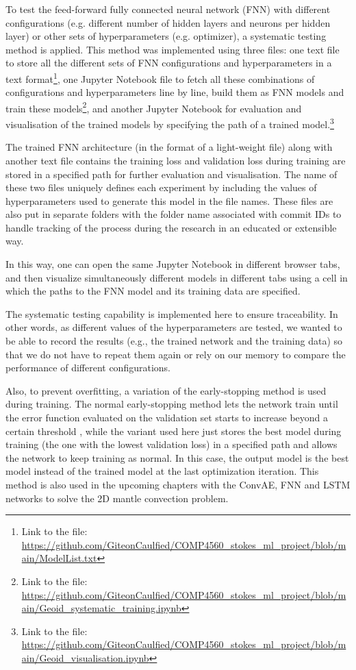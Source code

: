 To test the feed-forward fully connected neural network (FNN) with different configurations (e.g. different number of hidden layers and neurons per hidden layer) or other sets of hyperparameters (e.g. optimizer), a systematic testing method is applied. This method was implemented using three files: one text file to store all the different sets of FNN configurations and hyperparameters in a text format\footnote{Link to the file: \url{https://github.com/GiteonCaulfied/COMP4560_stokes_ml_project/blob/main/ModelList.txt}}, one Jupyter Notebook file to fetch all these combinations of configurations and hyperparameters line by line, build them as FNN models and train these models\footnote{Link to the file: \url{https://github.com/GiteonCaulfied/COMP4560_stokes_ml_project/blob/main/Geoid_systematic_training.ipynb}}, and another Jupyter Notebook for evaluation and visualisation of the trained models by specifying the path of a trained model.\footnote{Link to the file: \url{https://github.com/GiteonCaulfied/COMP4560_stokes_ml_project/blob/main/Geoid_visualisation.ipynb}}

The trained FNN architecture (in the format of a light-weight file) along with another text file contains the training loss and validation loss during training are stored in a specified path for further evaluation and visualisation. The name of these two files uniquely defines each experiment by including the values of hyperparameters used to generate this model in the file names. These files are also put in separate folders with the folder name associated with commit IDs to handle tracking of the process during the research in an educated or extensible way.

In this way, one can open the same Jupyter Notebook in different browser tabs, and then visualize simultaneously different models in different tabs using a cell in which the paths to the FNN model and its training data are specified. 

The systematic testing capability is implemented here to ensure traceability. In other words, as different values of the hyperparameters are tested, we wanted to be able to record the results (e.g., the trained network and the training data) so that we do not have to repeat them again or rely on our memory to compare the performance of different configurations.

Also, to prevent overfitting, a variation of the early-stopping method is used during training. The normal early-stopping method lets the network train until the error function evaluated on the validation set starts to increase beyond a certain threshold \citep{10.1007_978-3-642-35289-8_5}, while the variant used here just stores the best model during training (the one with the lowest validation loss) in a specified path and allows the network to keep training as normal. In this case, the output model is the best model instead of the trained model at the last optimization iteration. This method is also used in the upcoming chapters with the ConvAE, FNN and LSTM networks to solve the 2D mantle convection problem.

